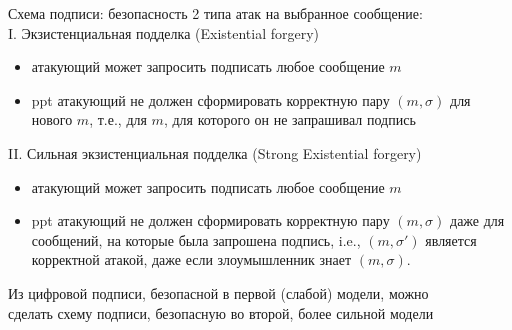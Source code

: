 \documentclass[usenames,dvipsnames,8pt,aspectratio=169]{beamer}
\begin{document}
\begin{frame}{Схема подписи: безопасность}
	\Large
	2 типа атак {\color{Orange} на выбранное сообщение}: \\[10pt]
	{\color{Orange}I. Экзистенциальная подделка (Existential forgery)} \\
	\large 
		\begin{itemize}
			\item атакующий может запросить подписать любое сообщение $m$
			\item ppt атакующий не должен сформировать корректную пару $(m, \sigma)$ для нового $m$, т.е.,  для $m$, для которого он не запрашивал подпись
		\end{itemize}
	\Large 
	\pause
	{\color{Orange}II. Сильная экзистенциальная подделка (Strong Existential forgery)} \\
	\large 
	\begin{itemize}
		\item атакующий может запросить подписать любое сообщение $m$
		\item  ppt атакующий не должен сформировать корректную пару $(m, \sigma)$  {\color{Orange}  даже для сообщений, на которые была запрошена подпись}, i.e., $(m, \sigma')$ является \\ корректной атакой, даже если злоумышленник знает $(m, \sigma)$.
	\end{itemize}

\vspace{10pt}

Из цифровой подписи, безопасной в первой (слабой) модели, можно \\ сделать схему подписи, безопасную во второй, более сильной модели
\end{frame}
\end{document}
